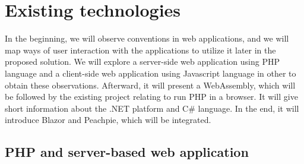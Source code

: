 \chapter{Existing technologies}

In the beginning, we will observe conventions in web applications, and we will map ways of user interaction with the applications to utilize it later in the proposed solution.
We will explore a server-side web application using PHP language and a client-side web application using Javascript language in other to obtain these observations.
Afterward, it will present a WebAssembly, which will be followed by the existing project relating to run PHP in a browser.
It will give short information about the .NET platform and C\# language.
In the end, it will introduce Blazor and Peachpie, which will be integrated.

\section{PHP and server-based web application}

